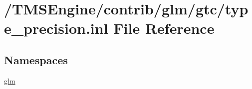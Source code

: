 \hypertarget{type__precision_8inl}{}\section{/\+T\+M\+S\+Engine/contrib/glm/gtc/type\+\_\+precision.inl File Reference}
\label{type__precision_8inl}
\subsection*{Namespaces}
\begin{DoxyCompactItemize}
\item 
 \hyperlink{namespaceglm}{glm}
\end{DoxyCompactItemize}

